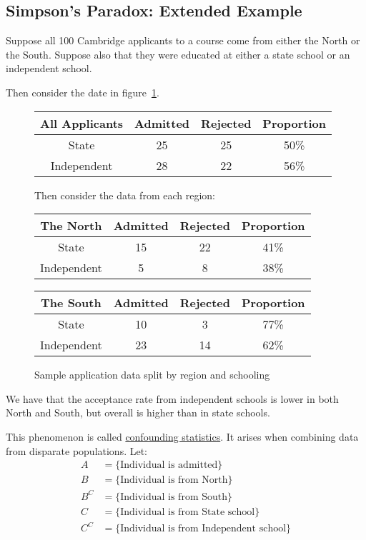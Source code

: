 \documentclass[../Main.tex]{subfiles}
\begin{document}
\subsection{Simpson's Paradox: Extended Example}
Suppose all 100 Cambridge applicants to a course come from either the North or the South. Suppose also that they were educated at either a state school or an independent school.\par
Then consider the date in figure~\ref{figApplicationData}.\par
\begin{figure}[ht]
    \centering
    \begin{tabular}{c|c|c|c}
        All Applicants& Admitted & Rejected & Proportion \\
        \hline
        State & 25 & 25 & 50\% \\
        Independent & 28 & 22 & 56\%
    \end{tabular}
    \par
    Then consider the data from each region:\par
    \begin{tabular}{c|c|c|c}
        The North & Admitted & Rejected & Proportion \\
        \hline
        State & 15 & 22 & 41\% \\
        Independent & 5 & 8 & 38\% \\
        \hline
    \end{tabular}
    \begin{tabular}{c|c|c|c}
        The South & Admitted & Rejected & Proportion \\
        \hline
        State & 10 & 3 & 77\% \\
        Independent & 23 & 14 & 62\%
    \end{tabular}
    \caption{Sample application data split by region and schooling}
    \label{figApplicationData}
\end{figure}
We have that the acceptance rate from independent schools is lower in both North and South, but overall is higher than in state schools.\par
This phenomenon is called \underline{confounding statistics}. It arises when combining data from disparate populations. Let:
\begin{align*}
    A &= \{\text{Individual is admitted}\} \\
    B &= \{\text{Individual is from North}\} \\
    B^C &= \{\text{Individual is from South}\} \\
    C &= \{\text{Individual is from State school}\} \\
    C^C &= \{\text{Individual is from Independent school}\}
\end{align*}
\end{document}
